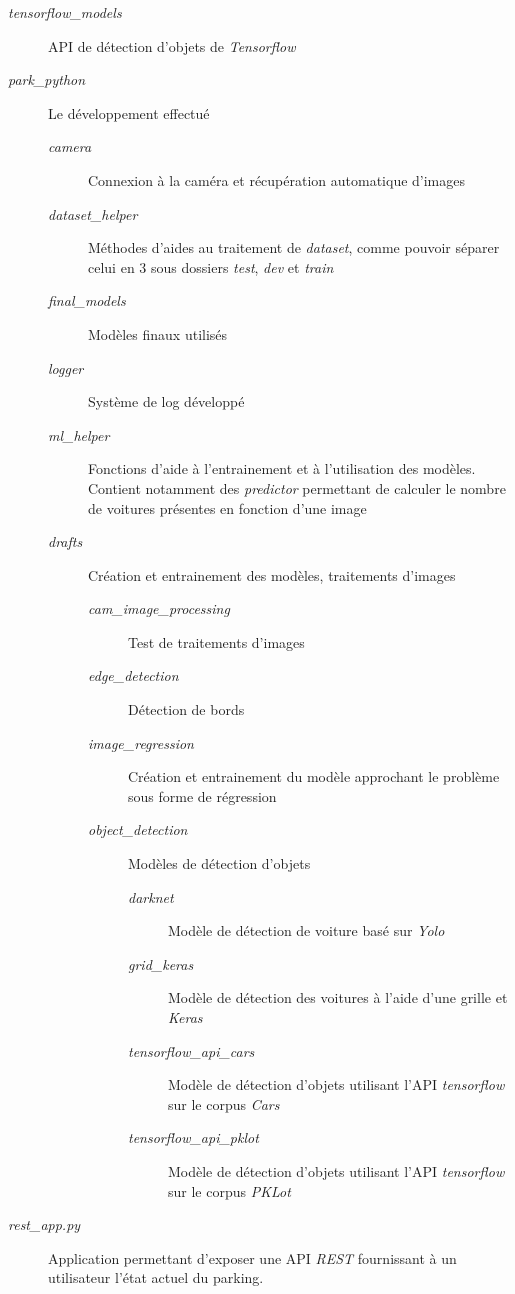 \begin{description}
    \item[\textit{tensorflow\_models}] API de détection d'objets de \textit{Tensorflow}
    \item[\textit{park\_python}] Le développement effectué
    \begin{description}
        \item[\textit{camera}] Connexion à la caméra et récupération automatique d'images
        \item[\textit{dataset\_helper}] Méthodes d'aides au traitement de \textit{dataset}, comme pouvoir séparer celui en 3 sous dossiers \textit{test}, \textit{dev} et \textit{train}
        \item[\textit{final\_models}] Modèles finaux utilisés
        \item[\textit{logger}] Système de log développé
        \item[\textit{ml\_helper}] Fonctions d'aide à l'entrainement et à l'utilisation des modèles. Contient notamment des \textit{predictor} permettant de calculer le nombre de voitures présentes en fonction d'une image
        \item[\textit{drafts}] Création et entrainement des modèles, traitements d'images
        \begin{description}
            \item[\textit{cam\_image\_processing}] Test de traitements d'images
            \item[\textit{edge\_detection}] Détection de bords
            \item[\textit{image\_regression}] Création et entrainement du modèle approchant le problème sous forme de régression
            \item[\textit{object\_detection}] Modèles de détection d'objets
            \begin{description}
                \item[\textit{darknet}] Modèle de détection de voiture basé sur \textit{Yolo}
                \item[\textit{grid\_keras}] Modèle de détection des voitures à l'aide d'une grille et \textit{Keras}
                \item[\textit{tensorflow\_api\_cars}] Modèle de détection d'objets utilisant l'API \textit{tensorflow} sur le corpus \textit{Cars}
                \item[\textit{tensorflow\_api\_pklot}] Modèle de détection d'objets utilisant l'API \textit{tensorflow} sur le corpus \textit{PKLot}
            \end{description}
        \end{description}
    \end{description}
    \item[\textit{rest\_app.py}] Application permettant d'exposer une API \textit{REST} fournissant à un utilisateur l'état actuel du parking.
\end{description}


